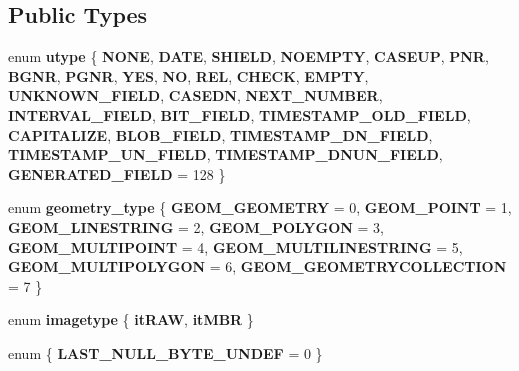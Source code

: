 \subsection*{Public Types}
\begin{DoxyCompactItemize}
\item 
\mbox{\label{classField_ab4dedb6c6e46d8d648c2cb1ff92d6634}} 
enum {\bfseries utype} \{ \newline
{\bfseries N\+O\+NE}, 
{\bfseries D\+A\+TE}, 
{\bfseries S\+H\+I\+E\+LD}, 
{\bfseries N\+O\+E\+M\+P\+TY}, 
\newline
{\bfseries C\+A\+S\+E\+UP}, 
{\bfseries P\+NR}, 
{\bfseries B\+G\+NR}, 
{\bfseries P\+G\+NR}, 
\newline
{\bfseries Y\+ES}, 
{\bfseries NO}, 
{\bfseries R\+EL}, 
{\bfseries C\+H\+E\+CK}, 
\newline
{\bfseries E\+M\+P\+TY}, 
{\bfseries U\+N\+K\+N\+O\+W\+N\+\_\+\+F\+I\+E\+LD}, 
{\bfseries C\+A\+S\+E\+DN}, 
{\bfseries N\+E\+X\+T\+\_\+\+N\+U\+M\+B\+ER}, 
\newline
{\bfseries I\+N\+T\+E\+R\+V\+A\+L\+\_\+\+F\+I\+E\+LD}, 
{\bfseries B\+I\+T\+\_\+\+F\+I\+E\+LD}, 
{\bfseries T\+I\+M\+E\+S\+T\+A\+M\+P\+\_\+\+O\+L\+D\+\_\+\+F\+I\+E\+LD}, 
{\bfseries C\+A\+P\+I\+T\+A\+L\+I\+ZE}, 
\newline
{\bfseries B\+L\+O\+B\+\_\+\+F\+I\+E\+LD}, 
{\bfseries T\+I\+M\+E\+S\+T\+A\+M\+P\+\_\+\+D\+N\+\_\+\+F\+I\+E\+LD}, 
{\bfseries T\+I\+M\+E\+S\+T\+A\+M\+P\+\_\+\+U\+N\+\_\+\+F\+I\+E\+LD}, 
{\bfseries T\+I\+M\+E\+S\+T\+A\+M\+P\+\_\+\+D\+N\+U\+N\+\_\+\+F\+I\+E\+LD}, 
\newline
{\bfseries G\+E\+N\+E\+R\+A\+T\+E\+D\+\_\+\+F\+I\+E\+LD} = 128
 \}
\item 
\mbox{\label{classField_a8d48130b2ee35a36404c756a4e3e41db}} 
enum {\bfseries geometry\+\_\+type} \{ \newline
{\bfseries G\+E\+O\+M\+\_\+\+G\+E\+O\+M\+E\+T\+RY} = 0, 
{\bfseries G\+E\+O\+M\+\_\+\+P\+O\+I\+NT} = 1, 
{\bfseries G\+E\+O\+M\+\_\+\+L\+I\+N\+E\+S\+T\+R\+I\+NG} = 2, 
{\bfseries G\+E\+O\+M\+\_\+\+P\+O\+L\+Y\+G\+ON} = 3, 
\newline
{\bfseries G\+E\+O\+M\+\_\+\+M\+U\+L\+T\+I\+P\+O\+I\+NT} = 4, 
{\bfseries G\+E\+O\+M\+\_\+\+M\+U\+L\+T\+I\+L\+I\+N\+E\+S\+T\+R\+I\+NG} = 5, 
{\bfseries G\+E\+O\+M\+\_\+\+M\+U\+L\+T\+I\+P\+O\+L\+Y\+G\+ON} = 6, 
{\bfseries G\+E\+O\+M\+\_\+\+G\+E\+O\+M\+E\+T\+R\+Y\+C\+O\+L\+L\+E\+C\+T\+I\+ON} = 7
 \}
\item 
\mbox{\label{classField_a1ccb308943bbfdb37fe6924f886b177c}} 
enum {\bfseries imagetype} \{ {\bfseries it\+R\+AW}, 
{\bfseries it\+M\+BR}
 \}
\item 
\mbox{\label{classField_aa6d508a405365e5a6c0414885e525f0c}} 
enum \{ {\bfseries L\+A\+S\+T\+\_\+\+N\+U\+L\+L\+\_\+\+B\+Y\+T\+E\+\_\+\+U\+N\+D\+EF} = 0
 \}
\end{DoxyCompactItemize}
